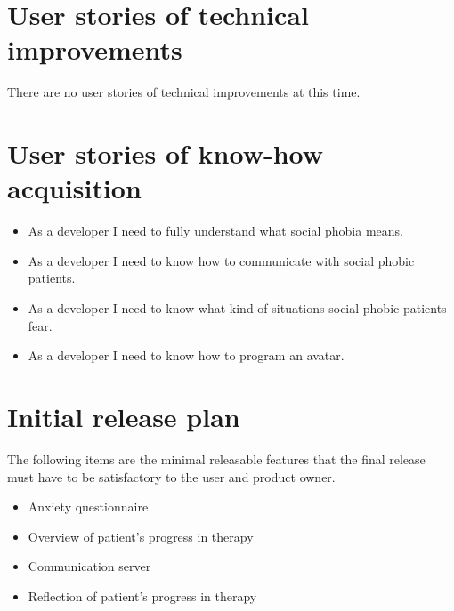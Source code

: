 \section{User stories of technical improvements}
There are no user stories of technical improvements at this time.

\section{User stories of know-how acquisition}
\begin{itemize}
\item As a developer I need to fully understand what social phobia means.
\item As a developer I need to know how to communicate with social phobic patients.
\item As a developer I need to know what kind of situations social phobic patients fear.
\item As a developer I need to know how to program an \gls{avatar}.
\end{itemize}

\section{Initial release plan}
The following items are the minimal releasable features that the final release must have to be satisfactory to the user and product owner.

\begin{itemize}
\item Anxiety questionnaire 
\item Overview of patient's progress in therapy
\item Communication server
\item Reflection of patient's progress in therapy
\end{itemize} 
